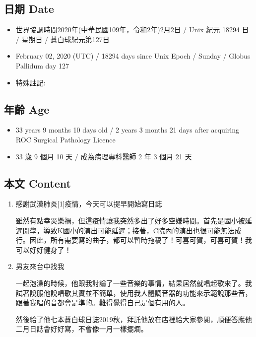 \documentclass[a5paper, 12pt
]{book}
\providecommand{\tightlist}{%
  \setlength{\itemsep}{0pt}\setlength{\parskip}{0pt}}
\begin{document}
\hypertarget{ux65e5ux671f-date-63}{%
\subsection{日期 Date}\label{ux65e5ux671f-date-63}}

\begin{itemize}
\tightlist
\item
  世界協調時間2020年(中華民國109年，令和2年)2月2日 / Unix 紀元 18294 日
  / 星期日 / 蒼白球紀元第127日
\item
  February 02, 2020 (UTC) / 18294 days since Unix Epoch / Sunday /
  Globus Pallidum day 127
\item
  特殊註記:
\end{itemize}

\hypertarget{ux5e74ux9f61-age-63}{%
\subsection{年齡 Age}\label{ux5e74ux9f61-age-63}}

\begin{itemize}
\tightlist
\item
  33 years 9 months 10 days old / 2 years 3 months 21 days after
  acquiring ROC Surgical Pathology Licence
\item
  33 歲 9 個月 10 天 / 成為病理專科醫師 2 年 3 個月 21 天
\end{itemize}

\hypertarget{ux672cux6587-content-63}{%
\subsection{本文 Content}\label{ux672cux6587-content-63}}

\begin{enumerate}
\def\labelenumi{\arabic{enumi}.}
\item
  感謝武漢肺炎{[}1{]}疫情，今天可以提早開始寫日誌

  雖然有點幸災樂禍，但這疫情讓我突然多出了好多空嫌時間。首先是國小被延遲開學，導致K國小的演出可能延遲；接著，C院內的演出也很可能無法成行。因此，所有需要寫的曲子，都可以暫時拖稿了！可喜可賀，可喜可賀！我可以好好健身了！
\item
  男友來台中找我

  一起泡澡的時候，他跟我討論了一些音樂的事情，結果居然就唱起歌來了。我試著說服他說唱歌其實並不簡單，使用我人體調音器的功能來示範說那些音，跟著我唱的音都會是準的。難得覺得自己是個有用的人。

  然後給了他七本蒼白球日誌2019秋，拜託他放在店裡給大家參閱，順便答應他二月日誌會好好寫，不會像一月一樣擺爛。
\end{enumerate}
\end{document}
